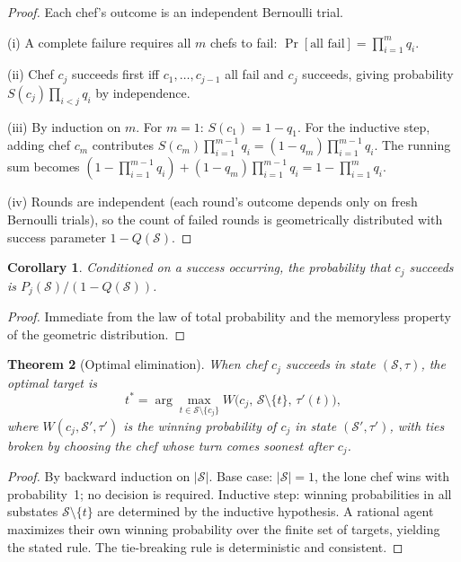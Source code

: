 \documentclass[12pt]{article}
\newtheorem{theorem}{Theorem}
\newtheorem{corollary}[theorem]{Corollary}
\begin{document}
\begin{proof}
Each chef's outcome is an independent Bernoulli trial.

(i) A complete failure requires all $m$ chefs to fail: $\Pr[\text{all fail}] = \prod_{i=1}^m q_i$.

(ii) Chef $c_j$ succeeds first iff $c_1,\ldots,c_{j-1}$ all fail and $c_j$ succeeds, giving probability $S(c_j)\prod_{i<j}q_i$ by independence.

(iii) By induction on $m$. For $m=1$: $S(c_1) = 1-q_1$. For the inductive step, adding chef $c_m$ contributes $S(c_m)\prod_{i=1}^{m-1}q_i = (1-q_m)\prod_{i=1}^{m-1}q_i$. The running sum becomes $(1-\prod_{i=1}^{m-1}q_i) + (1-q_m)\prod_{i=1}^{m-1}q_i = 1 - \prod_{i=1}^m q_i$.

(iv) Rounds are independent (each round's outcome depends only on fresh Bernoulli trials), so the count of failed rounds is geometrically distributed with success parameter $1-Q(\mathcal{S})$.
\end{proof}

\begin{corollary}\label{cor:cond}
Conditioned on a success occurring, the probability that $c_j$ succeeds is $P_j(\mathcal{S})/(1-Q(\mathcal{S}))$.
\end{corollary}

\begin{proof}
Immediate from the law of total probability and the memoryless property of the geometric distribution.
\end{proof}

\begin{theorem}[Optimal elimination]\label{thm:opt}
When chef $c_j$ succeeds in state $(\mathcal{S},\tau)$, the optimal target is
\[
t^* = \arg\max_{t\in\mathcal{S}\setminus\{c_j\}} W\bigl(c_j,\,\mathcal{S}\setminus\{t\},\,\tau'(t)\bigr),
\]
where $W(c_j,\mathcal{S}',\tau')$ is the winning probability of $c_j$ in state $(\mathcal{S}',\tau')$, with ties broken by choosing the chef whose turn comes soonest after $c_j$.
\end{theorem}

\begin{proof}
By backward induction on $|\mathcal{S}|$. Base case: $|\mathcal{S}|=1$, the lone chef wins with probability~1; no decision is required. Inductive step: winning probabilities in all substates $\mathcal{S}\setminus\{t\}$ are determined by the inductive hypothesis. A rational agent maximizes their own winning probability over the finite set of targets, yielding the stated rule. The tie-breaking rule is deterministic and consistent.
\end{proof}
\end{document}
